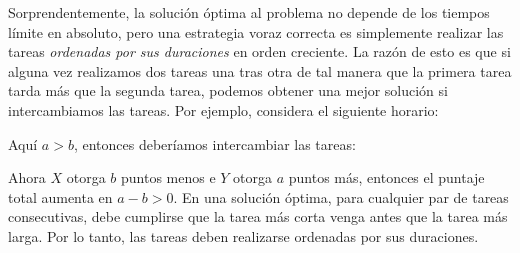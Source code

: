 Sorprendentemente, la solución óptima al problema
no depende de los tiempos límite en absoluto,
pero una estrategia voraz correcta es simplemente
realizar las tareas \emph{ordenadas por sus duraciones}
en orden creciente.
La razón de esto es que si alguna vez realizamos
dos tareas una tras otra de tal manera que la primera tarea
tarda más que la segunda tarea,
podemos obtener una mejor solución si intercambiamos las tareas.
Por ejemplo, considera el siguiente horario:
\begin{center}
\end{center}
Aquí $a>b$, entonces deberíamos intercambiar las tareas:
\begin{center}
\end{center}
Ahora $X$ otorga $b$ puntos menos e $Y$ otorga $a$ puntos más,
entonces el puntaje total aumenta en $a-b > 0$.
En una solución óptima,
para cualquier par de tareas consecutivas,
debe cumplirse que la tarea más corta venga
antes que la tarea más larga.
Por lo tanto, las tareas deben realizarse
ordenadas por sus duraciones.


